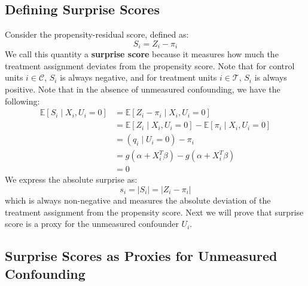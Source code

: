\documentclass[12pt,letterpaper]{article}  %
\begin{document}
\subsection*{Defining Surprise Scores}

Consider the propensity-residual score, defined as:
\begin{equation*}
    S_i = Z_i - \pi_i
\end{equation*}
We call this quantity a \textbf{surprise score} because it measures how much the treatment assignment deviates from the propensity score. Note that for control units $i \in \mathcal{C}$, $S_i$ is always negative, and for treatment units $i \in \mathcal{T}$, $S_i$ is always positive. Note that in the absence of unmeasured confounding, we have the following:
\begin{align*}
    \mathbb{E}[S_i \mid X_i, U_i = 0] &= \mathbb{E}[Z_i - \pi_i \mid X_i, U_i = 0] \\
    &= \mathbb{E}[Z_i \mid X_i, U_i = 0] - \mathbb{E}[\pi_i \mid X_i, U_i = 0] \\
    &= (q_i \mid U_i = 0) - \pi_i \\
    &= g(\alpha + X_i^T \beta) - g(\alpha + X_i^T \beta) \\
    &= 0
\end{align*}
We express the absolute surprise as:
\begin{equation*}
    s_i = |S_i| = |Z_i - \pi_i|
\end{equation*}
which is always non-negative and measures the absolute deviation of the treatment assignment from the propensity score. Next we will prove that surprise score is a proxy for the unmeasured confounder $U_i$.

\subsection*{Surprise Scores as Proxies for Unmeasured Confounding}
\end{document}

